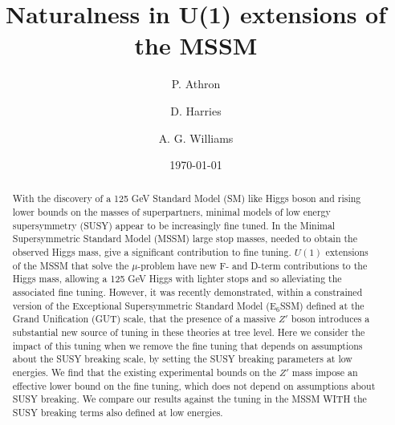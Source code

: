 \documentclass[preprint,amsmath,amssymb,aps,superscriptaddress,prd,showpacs,floatfix]{revtex4-1}
\begin{document}
\title{Naturalness in U(1) extensions of the MSSM}

\author{P. Athron}

\author{D. Harries}

\author{A. G. Williams}

\date{\today}%

\begin{abstract}
With the discovery of a 125 GeV Standard Model (SM) like Higgs boson
and rising lower bounds on the masses of superpartners, minimal models
of low energy supersymmetry (SUSY) appear to be increasingly fine
tuned. In the Minimal Supersymmetric Standard Model (MSSM) large stop
masses, needed to obtain the observed Higgs mass, give a significant
contribution to fine tuning. $U(1)$ extensions of the MSSM that solve
the $\mu$-problem have new F- and D-term contributions to the Higgs mass,
allowing a 125 GeV Higgs with lighter stops and so alleviating the
associated fine tuning. However, it was recently demonstrated, within
a constrained version of the Exceptional Supersymmetric Standard Model (E$_6$SSM)
defined at the Grand Unification (GUT) scale, that the presence of a massive $Z'$ boson introduces a 
substantial new source of tuning in these theories at tree level. Here we
consider the impact of this tuning when we remove the fine tuning that depends
on assumptions about the SUSY breaking scale, by setting the SUSY
breaking parameters at low energies. We find that the existing
experimental bounds on the $Z'$ mass impose an effective lower bound on
the fine tuning, which does not depend on assumptions about SUSY breaking. 
We compare our results against the tuning in the MSSM WITH the SUSY breaking terms also defined at low energies.

\end{abstract}
\end{document}
